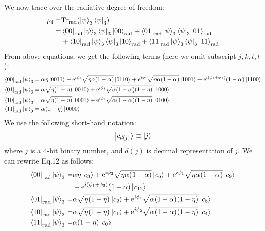 We now trace over the radiative degree of freedom:
\begin{subequations}
    \begin{align}
        \rho_{4} =& \text{Tr}_{\text{rad}}(\ket{\psi}_{3}\bra{\psi}_{3})\\
        =& \bra{00}_{\text{rad}}\ket{\psi}_{3}\bra{\psi}_{3}\ket{00}_{\text{rad}} + \bra{01}_{\text{rad}}\ket{\psi}_{3}\bra{\psi}_{3}\ket{01}_{\text{rad}}\nonumber\\
        &+ \bra{10}_{\text{rad}}\ket{\psi}_{3}\bra{\psi}_{3}\ket{10}_{\text{rad}} + \bra{11}_{\text{rad}}\ket{\psi}_{3}\bra{\psi}_{3}\ket{11}_{\text{rad}}
    \end{align}
\end{subequations}
From above equations, we get the following terms (here we omit subscript $j,k,t,t$):
\begin{subequations}
    \begin{align}
        \bra{00}_\text{rad}\ket{\psi}_{3} &= \alpha\eta\ket{0011} + \text{e}^{i\phi_{2}}\sqrt{\eta\alpha(1-\alpha)}\ket{0110} + \text{e}^{i\phi_{1}}\sqrt{\eta\alpha(1-\alpha)}\ket{1001} + \text{e}^{i(\phi_{1}+\phi_{2})}(1-\alpha)\ket{1100}\\
        \bra{01}_\text{rad}\ket{\psi}_{3} &=
        \alpha\sqrt{\eta(1-\eta)}\ket{0010} + \text{e}^{i\phi_{1}}\sqrt{\alpha(1-\alpha)(1-\eta)}\ket{1000}\\
        \bra{10}_\text{rad}\ket{\psi}_{3} &= \alpha\sqrt{\eta(1-\eta)}\ket{0001} + \text{e}^{i\phi_{2}}\sqrt{\alpha(1-\alpha)(1-\eta)}\ket{0100}\\
        \bra{11}_\text{rad}\ket{\psi}_{3} &=
        \alpha(1-\eta)\ket{0000}
    \end{align}
\end{subequations}
We use the following short-hand notation:
\begin{equation}
        \ket{c_{d(j)}}\equiv\ket{j}
\end{equation}
where $j$ is a 4-bit binary number, and $d(j)$ is decimal representation of $j$. We can rewrite Eq.12 as follows:
\begin{subequations}
    \begin{align}
        \bra{00}_\text{rad}\ket{\psi}_{3} =& \alpha\eta\ket{c_{3}} + \text{e}^{i\phi_{2}}\sqrt{\eta\alpha(1-\alpha)}\ket{c_{6}} + \text{e}^{i\phi_{1}}\sqrt{\eta\alpha(1-\alpha)}\ket{c_{9}} \nonumber\\
        &+ \text{e}^{i(\phi_{1}+\phi_{2})}(1-\alpha)\ket{c_{12}}\\
        \bra{01}_\text{rad}\ket{\psi}_{3} =&
        \alpha\sqrt{\eta(1-\eta)}\ket{c_{2}} + \text{e}^{i\phi_{1}}\sqrt{\alpha(1-\alpha)(1-\eta)}\ket{c_{8}}\\
        \bra{10}_\text{rad}\ket{\psi}_{3} =& \alpha\sqrt{\eta(1-\eta)}\ket{c_{1}} + \text{e}^{i\phi_{2}}\sqrt{\alpha(1-\alpha)(1-\eta)}\ket{c_{4}}\\
        \bra{11}_\text{rad}\ket{\psi}_{3} =&
        \alpha(1-\eta)\ket{c_{0}}
    \end{align}
\end{subequations}
